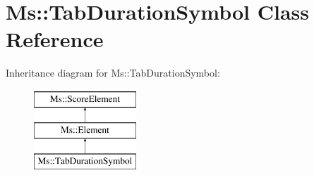 \hypertarget{class_ms_1_1_tab_duration_symbol}{}\section{Ms\+:\+:Tab\+Duration\+Symbol Class Reference}
\label{class_ms_1_1_tab_duration_symbol}
Inheritance diagram for Ms\+:\+:Tab\+Duration\+Symbol\+:\begin{figure}[H]
\begin{center}
\leavevmode
\includegraphics[height=3.000000cm]{class_ms_1_1_tab_duration_symbol}
\end{center}
\end{figure}

